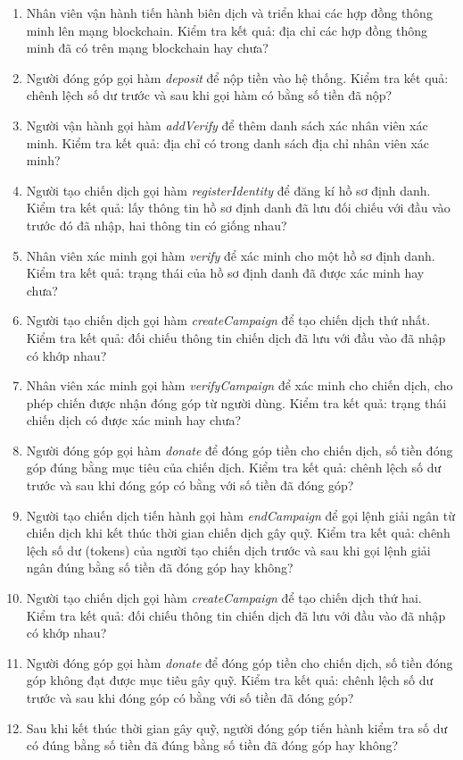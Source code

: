 \documentclass[../main-report.tex]{subfiles}
\begin{document}
\begin{enumerate}[label=(\arabic*)]
\item Nhân viên vận hành tiến hành biên dịch và triển khai các hợp đồng thông minh lên mạng blockchain. Kiểm tra kết quả: địa chỉ các hợp đồng thông minh đã có trên mạng blockchain hay chưa?
\item Người đóng góp gọi hàm \textit{deposit} để nộp tiền vào hệ thống. Kiểm tra kết quả: chênh lệch số dư trước và sau khi gọi hàm có bằng số tiền đã nộp?
\item Người vận hành gọi hàm \textit{addVerify} để thêm danh sách xác nhân viên xác minh. Kiểm tra kết quả: địa chỉ có trong danh sách địa chỉ nhân viên xác minh?
\item Người tạo chiến dịch gọi hàm \textit{registerIdentity} để đăng kí hồ sơ định danh. Kiểm tra kết quả: lấy thông tin hồ sơ định danh đã lưu đối chiếu với đầu vào trước đó đã nhập, hai thông tin có giống nhau?
\item Nhân viên xác minh gọi hàm \textit{verify} để xác minh cho một hồ sơ định danh. Kiểm tra kết quả: trạng thái của hồ sơ định danh đã được xác minh hay chưa?
\item Người tạo chiến dịch gọi hàm \textit{createCampaign} để tạo chiến dịch thứ nhất. Kiểm tra kết quả: đối chiếu thông tin chiến dịch đã lưu với đầu vào đã nhập có khớp nhau?
\item Nhân viên xác minh gọi hàm \textit{verifyCampaign} để xác minh cho chiến dịch, cho phép chiến được nhận đóng góp từ người dùng. Kiểm tra kết quả: trạng thái chiến dịch có được xác minh hay chưa?
\item Người đóng góp gọi hàm \textit{donate} để đóng góp tiền cho chiến dịch, số tiền đóng góp đúng bằng mục tiêu của chiến dịch. Kiểm tra kết quả: chênh lệch số dư trước và sau khi đóng góp có bằng với số tiền đã đóng góp?
\item Người tạo chiến dịch tiến hành gọi hàm \textit{endCampaign} để gọi lệnh giải ngân từ chiến dịch khi kết thúc thời gian chiến dịch gây quỹ. Kiểm tra kết quả: chênh lệch số dư (tokens) của người tạo chiến dịch trước và sau khi gọi lệnh giải ngân đúng bằng số tiền đã đóng góp hay không?
\item Người tạo chiến dịch gọi hàm \textit{createCampaign} để tạo chiến dịch thứ hai. Kiểm tra kết quả: đối chiếu thông tin chiến dịch đã lưu với đầu vào đã nhập có khớp nhau?
\item Người đóng góp gọi hàm \textit{donate} để đóng góp tiền cho chiến dịch, số tiền đóng góp không đạt được mục tiêu gây quỹ. Kiểm tra kết quả: chênh lệch số dư trước và sau khi đóng góp có bằng với số tiền đã đóng góp?
\item Sau khi kết thúc thời gian gây quỹ, người đóng góp tiến hành kiểm tra số dư có đúng bằng số tiền đã đúng bằng số tiền đã đóng góp hay không?
\end{enumerate}
\end{document}
